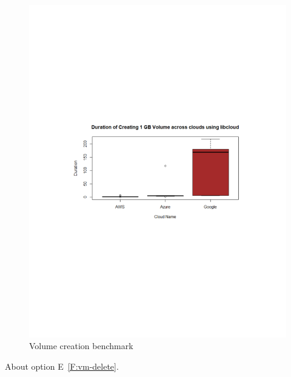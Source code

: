 \begin{figure}[!ht]
  \centering
  \includegraphics[width=\columnwidth]{images/Create1GBVol.pdf}
  \caption{Volume creation benchmark}\label{F:vm-volume}
\end{figure}

About option E~\ref{F:vm-delete}.

